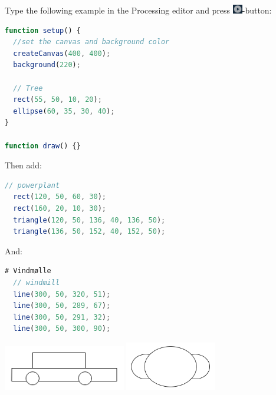 \newpage
{}
\begin{exercisebox}[adjusted title=First Program]
Type the following example in the Processing editor and press
\includegraphics[height=4mm]{illustrationer/processing_play_button}-button:

\begin{lstlisting}[language=JavaScript]
function setup() {
  //set the canvas and background color
  createCanvas(400, 400);
  background(220);
  
  // Tree
  rect(55, 50, 10, 20);
  ellipse(60, 35, 30, 40);
}

function draw() {}


\end{lstlisting}


Then add:
\begin{lstlisting}[language=JavaScript]
  // powerplant
  rect(120, 50, 60, 30);
  rect(160, 20, 10, 30);
  triangle(120, 50, 136, 40, 136, 50);
  triangle(136, 50, 152, 40, 152, 50);

\end{lstlisting}
And:
\begin{lstlisting}[language=JavaScript]
# Vindmølle
  // windmill
  line(300, 50, 320, 51);
  line(300, 50, 289, 67);
  line(300, 50, 291, 32);
  line(300, 50, 300, 90);
\end{lstlisting}

\includegraphics[width=0.4\textwidth]{illustrationer/bil-streg.png}
\includegraphics[width=0.3\textwidth]{illustrationer/sky.png}
\end{exercisebox}

